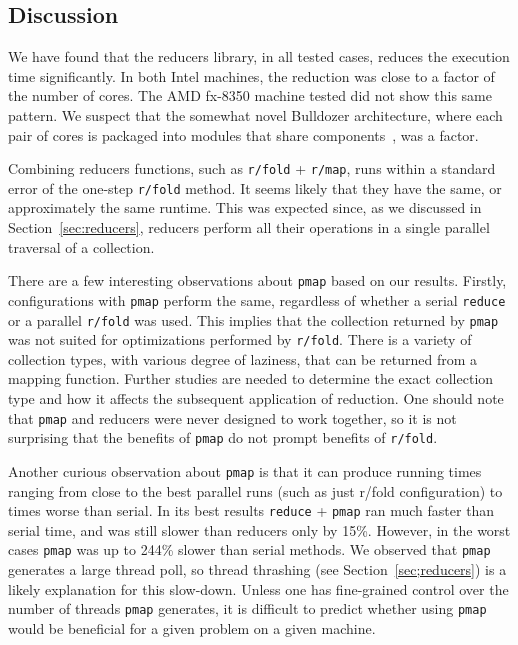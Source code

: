 \documentclass[12pt]{article}
\newcommand{\clocode}[1]{{\texttt {#1}}}
\begin{document}
\subsection{Discussion}\label{sec:discussion}

We have found that the reducers library, in all tested cases, reduces the execution time significantly. In both Intel machines, the reduction was close to a factor of the number of cores. The AMD fx-8350 machine tested did not show this same pattern. We suspect that the somewhat novel Bulldozer architecture, where each pair of cores is packaged into modules that share components~\cite{McIntyre:2012},  was a factor. 

Combining reducers functions, such as \clocode{r/fold} + \clocode{r/map}, runs within a standard error of the one-step \clocode{r/fold} method. It seems likely that they have the same, or approximately the same runtime. This was expected since, as we discussed in Section~\ref{sec:reducers}, reducers perform all their operations in a single parallel traversal of a collection. 

There are a few interesting observations about \clocode{pmap} based on our results. Firstly, configurations with \clocode{pmap} perform the same, regardless of whether a serial \clocode{reduce} or a parallel \clocode{r/fold} was used. This implies that the collection returned by \clocode{pmap} was not suited for optimizations performed by \clocode{r/fold}. 
There is a variety of collection types, with various degree of laziness, that can be returned from a mapping function. 
Further studies are needed to determine the exact collection type and how it affects the subsequent application of reduction. 
One should note that \clocode{pmap} and reducers were never designed to work together, so it is not surprising that the benefits of  \clocode{pmap} do not prompt benefits of \clocode{r/fold}. 

Another curious observation about  \clocode{pmap} is that it can produce running times ranging from close to the best parallel runs (such as just r/fold configuration) to times worse than serial. In its best results \clocode{reduce} + \clocode{pmap} ran much faster than serial time, and was still slower than reducers only by 15\%. However, in the worst cases  \clocode{pmap} was up to 244\% slower than serial methods. We observed that  \clocode{pmap} generates a large thread poll, so thread thrashing (see Section~\ref{sec;reducers}) is a likely explanation for this slow-down. Unless one has fine-grained control over the number of threads \clocode{pmap} generates, it is difficult to predict whether using  \clocode{pmap} would be beneficial for a given problem on a given machine. 
\end{document}
